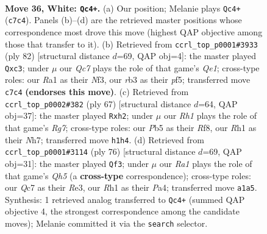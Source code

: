 \documentclass[11pt]{article}
\begin{document}
\clearpage

\begin{figure}[p]\centering
\begin{subfigure}{0.46\textwidth}\centering
\resizebox{\linewidth}{!}{%
\newchessgame
\chessboard[
  setfen={5nk1/ppQ4p/7p/1P6/3P4/1r3q2/4N3/R5KR w - - 7 36},
  showmover=false,
  pgfstyle=straightmove, color=movearrow, markmove={c7-c4}
]}
\caption{}
\end{subfigure}\hfill
\begin{subfigure}{0.46\textwidth}\centering
\resizebox{\linewidth}{!}{%
\newchessgame
\chessboard[
  setfen={1k1N4/1p6/p5RP/5p2/4p3/q1n2N2/2P5/1K2Q3 w - - 2 42},
  showmover=false,
  pgfstyle=straightmove, color=movearrow, markmove={e1-c3}
]}
\caption{}
\end{subfigure}
\\[4pt]
\begin{subfigure}{0.46\textwidth}\centering
\resizebox{\linewidth}{!}{%
\newchessgame
\chessboard[
  setfen={5r1k/2q4n/p2N1p2/8/4Q3/8/PPP1N1rP/1K1R4 b - - 3 34},
  showmover=false,
  pgfstyle=straightmove, color=movearrow, markmove={g2-h2}
]}
\caption{}
\end{subfigure}\hfill
\begin{subfigure}{0.46\textwidth}\centering
\resizebox{\linewidth}{!}{%
\newchessgame
\chessboard[
  setfen={2r2k2/3q1p2/4n3/p6Q/P1N5/1P1pR1P1/8/5K2 w - - 4 39},
  showmover=false,
  pgfstyle=straightmove, color=movearrow, markmove={h5-f3}
]}
\caption{}
\end{subfigure}
\caption{\textbf{Move 36, White: \texttt{Qc4+}.} (a) Our position; Melanie plays \texttt{Qc4+} (\texttt{c7c4}). Panels (b)--(d) are the retrieved master positions whose correspondence most drove this move (highest QAP objective among those that transfer to it). (b) Retrieved from \texttt{ccrl\_top\_p0001\#3933} (ply 82) [structural distance $d$=69, QAP obj=4]: the master played \texttt{Qxc3}; under $\mu$ our \emph{Qc7} plays the role of that game's \emph{Qe1}; cross-type roles: our \emph{R}a1 as their \emph{N}f3, our \emph{r}b3 as their \emph{p}f5; transferred move \texttt{c7c4} \textbf{(endorses this move)}. (c) Retrieved from \texttt{ccrl\_top\_p0002\#382} (ply 67) [structural distance $d$=64, QAP obj=37]: the master played \texttt{Rxh2}; under $\mu$ our \emph{Rh1} plays the role of that game's \emph{Rg7}; cross-type roles: our \emph{P}b5 as their \emph{R}f8, our \emph{R}h1 as their \emph{N}h7; transferred move \texttt{h1h4}. (d) Retrieved from \texttt{ccrl\_top\_p0001\#3114} (ply 76) [structural distance $d$=69, QAP obj=31]: the master played \texttt{Qf3}; under $\mu$ our \emph{Ra1} plays the role of that game's \emph{Qh5} (a \textbf{cross-type} correspondence); cross-type roles: our \emph{Q}c7 as their \emph{R}e3, our \emph{R}h1 as their \emph{P}a4; transferred move \texttt{a1a5}. Synthesis: 1 retrieved analog transferred to \texttt{Qc4+} (summed QAP objective 4, the strongest correspondence among the candidate moves); Melanie committed it via the \texttt{search} selector.}
\label{fig:thought-m70}
\end{figure}
\end{document}
